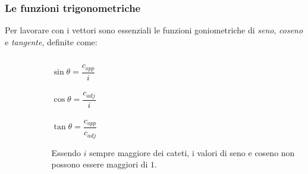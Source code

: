 \documentclass[]{beamer}
\begin{document}
\begin{frame}
  \frametitle{Le funzioni trigonometriche}
Per lavorare con i vettori sono essenziali le funzioni goniometriche di \emph{seno}, \emph{coseno} e \emph{tangente}, definite come:



\begin{columns}
\begin{column}{0.5\textwidth}

  \begin{figure}
  \end{figure}

\end{column}
\begin{column}{0.5\textwidth}

\begin{center}
\colorbox{marroncino!30}{$ \sin\theta = \dfrac{c_{opp}}{i} $}\\~\\
\colorbox{marroncino!30}{$ \cos\theta = \dfrac{c_{adj}}{i} $}\\~\\
\colorbox{marroncino!30}{$ \tan\theta = \dfrac{c_{opp}}{c_{adj}} $}
\end{center}
Essendo $ i $ sempre maggiore dei cateti, i valori di seno e coseno non possono essere maggiori di $ 1 $.
\end{column}
\end{columns}
\end{frame}
\end{document}
